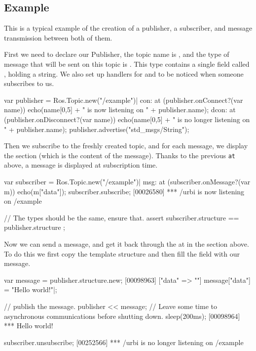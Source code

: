 \subsection{Example}

This is a typical example of the creation of a publisher, a subscriber, and
message transmission between both of them.

First we need to declare our Publisher, the topic name is ,
and the type of message that will be sent on this topic is
. This type contains a single field called
, holding a string.  We also set up handlers for
 and  to be noticed when someone
subscribes to us.

\begin{urbiscript}
var publisher = Ros.Topic.new("/example")|
con: at (publisher.onConnect?(var name))
  echo(name[0,5] + " is now listening on " + publisher.name);
dcon: at (publisher.onDisconnect?(var name))
  echo(name[0,5] + " is no longer listening on " + publisher.name);
publisher.advertise("std_msgs/String");
\end{urbiscript}

Then we subscribe to the freshly created topic, and for each message, we
display the  section (which is the content of the
message). Thanks to the previous \lstinline{at} above, a message is
displayed at subscription time.

\begin{urbiscript}
var subscriber = Ros.Topic.new("/example")|
msg: at (subscriber.onMessage?(var m))
  echo(m["data"]);
subscriber.subscribe;
[00026580] *** /urbi is now listening on /example

// The types should be the same, ensure that.
assert { subscriber.structure == publisher.structure };
\end{urbiscript}

\begin{comment}
\begin{urbiscript}
// A small delay to let the "is now listening" message arrives
// before the next interaction.
sleep(500ms);
\end{urbiscript}
\end{comment}

Now we can send a message, and get it back through the at in the section
above. To do this we first copy the template structure and then fill the
field  with our message.

\begin{urbiscript}
var message = publisher.structure.new;
[00098963] ["data" => ""]
message["data"] = "Hello world!"|;

// publish the message.
publisher << message;
// Leave some time to asynchronous communications before shutting down.
sleep(200ms);
[00098964] *** Hello world!

subscriber.unsubscribe;
[00252566] *** /urbi is no longer listening on /example
\end{urbiscript}



